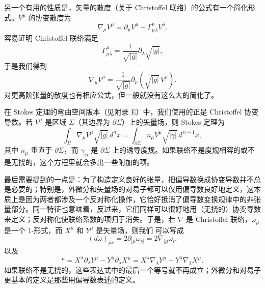 另一个有用的性质是，矢量的散度（关于 Christoffel 联络）的公式有一个简化形式。$V^\mu$ 的协变散度为
\begin{equation*}
\nabla_\mu V^\mu = \partial_\mu V^\mu + \Gamma^\mu_{\mu\lambda}V^\lambda.
\tag{3.32}
\end{equation*}
容易证明 Christoffel 联络满足
\begin{equation*}
\Gamma^\mu_{\mu\lambda} = \frac{1}{\sqrt{|g|}}\partial_\lambda\sqrt{|g|},
\tag{3.33}
\end{equation*}
于是我们得到
\begin{equation*}
\nabla_\mu V^\mu = \frac{1}{\sqrt{|g|}}\partial_\mu\left(\sqrt{|g|}\,V^\mu\right).
\tag{3.34}
\end{equation*}
对更高阶张量的散度也有相应公式，但一般就没有这么大的简化了。

在 Stokes 定理的弯曲空间版本（见附录 E）中，我们使用的正是 Christoffel 协变导数。若 $V^\mu$ 是区域 $\Sigma$（其边界为 $\partial\Sigma$）上的矢量场，则 Stokes 定理为
\begin{equation*}
\boxed{\;\int_\Sigma \nabla_\mu V^\mu\sqrt{|g|}\,d^nx = \int_{\partial\Sigma} n_\mu V^\mu\sqrt{|\gamma|}\,d^{\,n-1}x,\;}
\tag{3.35}
\end{equation*}
其中 $n_\mu$ 垂直于 $\partial\Sigma$，而 $\gamma_{ij}$ 是 $\partial\Sigma$ 上的诱导度规。如果联络不是度规相容的或不是无挠的，这个方程里就会多出一些附加的项。

最后需要提到的一点是：为了构造定义良好的张量，把偏导数换成协变导数并不总是必要的；特别是，外微分和矢量场的对易子都可以仅用偏导数良好地定义，这本质上是因为两者都涉及一个反对称化操作，它恰好抵消了偏导数变换规律中的非张量部分。同一特征也意味着，反过来，它们同样可以很好地用（无挠的）协变导数来定义；反对称化使联络系数的项归于消失。于是，若 $\nabla$ 是 Christoffel 联络，$\omega_\mu$ 是一个 1-形式，而 $X^\mu$ 和 $Y^\mu$ 是矢量场，则我们
可以写成
\begin{equation*}
(d\omega)_{\mu\nu} = 2\partial_{[\mu}\omega_{\nu]} = 2\nabla_{[\mu}\omega_{\nu]}
\tag{3.36}
\end{equation*}
以及
\begin{equation*}
[X,Y]^\mu = X^\lambda\partial_\lambda Y^\mu - Y^\lambda\partial_\lambda X^\mu = X^\lambda\nabla_\lambda Y^\mu - Y^\lambda\nabla_\lambda X^\mu.
\tag{3.37}
\end{equation*}
如果联络不是无挠的，这些表达式中的最后一个等号就不再成立；外微分和对易子更基本的定义是那些用偏导数表述的定义。

